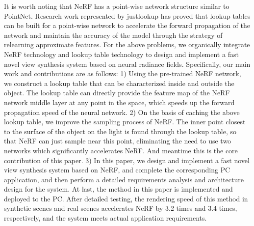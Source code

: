 \begin{abstract*}
It is worth noting that NeRF has a point-wise network structure similar to PointNet. Research work represented by justlookup has proved that lookup tables can be built for a point-wise network to accelerate the forward propagation of the network and maintain the accuracy of the model through the strategy of relearning approximate features. For the above problems, we organically integrate NeRF technology and lookup table technology to design and implement a fast novel view synthesis system based on neural radiance fields. Specifically, our main work and contributions are as follows: 1) Using the pre-trained NeRF network, we construct a lookup table that can be characterized inside and outside the object. The lookup table can directly provide the feature map of the NeRF network middle layer at any point in the space, which speeds up the forward propagation speed of the neural network. 2) On the basis of caching the above lookup table, we improve the sampling process of NeRF. The inner point closest to the surface of the object on the light is found through the lookup table, so that NeRF can just sample near this point, eliminating the need to use two networks which significantly accelerates NeRF. And meantime this is the core contribution of this paper. 3) In this paper, we design and implement a fast novel view synthesis system based on NeRF, and complete the corresponding PC application, and then perform a detailed requirements analysis and architecture design for the system. At last, the method in this paper is implemented and deployed to the PC. After detailed testing, the rendering speed of this method in synthetic scenes and real scenes accelerates NeRF by 3.2 times and 3.4 times, respectively, and the system meets actual application requirements.



\end{abstract*}
